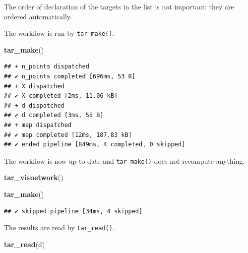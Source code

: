 \documentclass[
  12pt,
  american,
  a4paper,
  extrafontsizes,onecolumn,openright
  ]{memoir}
\newenvironment{Shaded}{\begin{snugshade}}{\end{snugshade}}
\newcommand{\FunctionTok}[1]{\textcolor[rgb]{0.13,0.29,0.53}{\textbf{#1}}}
\newcommand{\NormalTok}[1]{#1}
\begin{document}
\normalsize

The order of declaration of the targets in the list is not important: they are ordered automatically.

The workflow is run by \texttt{tar\_make()}.

\scriptsize

\begin{Shaded}
\begin{Highlighting}[]
\FunctionTok{tar\_make}\NormalTok{()}
\end{Highlighting}
\end{Shaded}

\begin{verbatim}
## + n_points dispatched
## ✔ n_points completed [696ms, 53 B]
## + X dispatched
## ✔ X completed [2ms, 11.06 kB]
## + d dispatched
## ✔ d completed [3ms, 55 B]
## + map dispatched
## ✔ map completed [12ms, 187.83 kB]
## ✔ ended pipeline [849ms, 4 completed, 0 skipped]
\end{verbatim}

\normalsize

The workflow is now up to date and \texttt{tar\_make()} does not recompute anything.

\scriptsize

\begin{Shaded}
\begin{Highlighting}[]
\FunctionTok{tar\_visnetwork}\NormalTok{()}
\end{Highlighting}
\end{Shaded}

\begin{Shaded}
\begin{Highlighting}[]
\FunctionTok{tar\_make}\NormalTok{()}
\end{Highlighting}
\end{Shaded}

\begin{verbatim}
## ✔ skipped pipeline [34ms, 4 skipped]
\end{verbatim}

\normalsize

The results are read by \texttt{tar\_read()}.

\scriptsize

\begin{Shaded}
\begin{Highlighting}[]
\FunctionTok{tar\_read}\NormalTok{(d)}
\end{Highlighting}
\end{Shaded}
\end{document}

